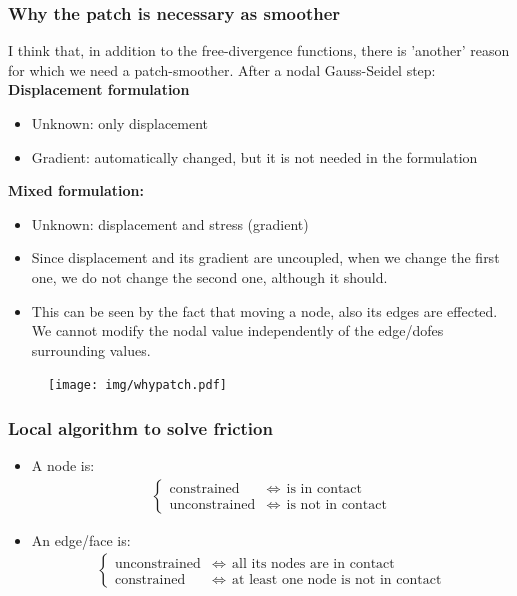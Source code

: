 \documentclass[8pt, oneside]{beamer}   	%
\begin{document}
\begin{frame}
\frametitle{\textbf{Why the patch is necessary as smoother}}
I think that, in addition to the free-divergence functions, there is 'another' reason for which we need a patch-smoother. After a nodal Gauss-Seidel step:\\
\textbf{Displacement formulation}
\begin{itemize}
\item Unknown: only displacement
\item Gradient: automatically changed, but it is not needed in the formulation
\end{itemize}
\textbf{Mixed formulation:
}\begin{itemize}
\item Unknown: displacement and stress (gradient)
\item Since displacement and its gradient are uncoupled, when we change the first one, we do not change the second one, although it should. 
\item This can be seen by the fact that moving a node, also its edges are effected. We cannot modify the nodal value independently of the edge/dofes surrounding values.
\end{itemize}
\begin{figure}[htbp!]
			\texttt{[image: img/whypatch.pdf]}
\end{figure}
\end{frame}


\begin{frame}
\frametitle{\textbf{Local algorithm to solve friction}}
\begin{itemize}
\item A node is:
\begin{align*}
\begin{cases}
\text{constrained}  &\iff \: \:\text{is in contact}\\
\text{unconstrained} &\iff \:\: \text{is not in contact}
\end{cases}
\end{align*} 
\item An edge/face is:
\begin{align*}
\begin{cases}
\text{unconstrained}  &\iff \: \:\text{all its nodes are in contact}\\
\text{constrained} &\iff \:\: \text{at least one node is not in contact}
\end{cases}
\end{align*} 

\end{itemize}

\end{frame}
\end{document}
